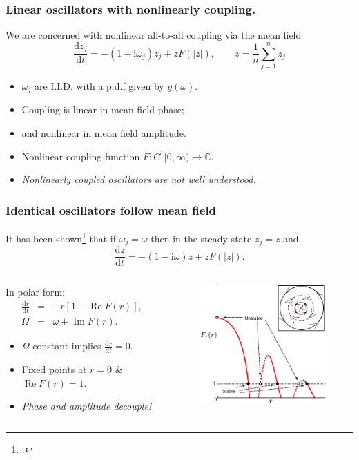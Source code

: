 \documentclass[10pt,reqno]{beamer}
\newcommand{\D}[2]{\frac{\mathrm{d} #1}{\mathrm{d} #2}}
\newcommand{\I}{\mathrm{i}}
\renewcommand{\mod}[1]{\left|#1\right|}
\renewcommand{\Re}{\operatorname{Re}}
\renewcommand{\Im}{\operatorname{Im}}
\newcommand{\complex}{\mathbb{C}}
\begin{document}
\begin{frame}[t]
\frametitle{Linear oscillators with nonlinearly coupling.}
We are concerned with nonlinear all-to-all coupling via the mean field
\[
\D{z_j}{t} = -(1-\I\omega_j)z_j + zF(\mod{z}), \qquad z= \frac{1}{n}\sum_{j=1}^n z_j
\] 
\begin{itemize}
\item $\omega_j$ are I.I.D. with a p.d.f given by $g(\omega)$.
\item Coupling is linear in mean field phase;
\item and nonlinear in mean field amplitude.
\item Nonlinear coupling function $F :C^1 [0,\infty) \rightarrow \complex$. 
\item {\em Nonlinearly coupled oscillators are not well understood.}
\end{itemize}
\end{frame}
\begin{frame}
\frametitle{Identical oscillators follow mean field}
It has been shown\footcite{Cathy2012} that if $\omega_j=\omega$ then 
in the steady state $z_j=z$ and 
\[
\D{z}{t}= -(1-\I\omega)z + zF(\mod{z}).
\] 
\begin{columns}
\begin{column}{0.59\textwidth}
In polar form:
\begin{eqnarray*}
\D{r}{t} &=& -r[1-\Re F(r)],\\
\Omega &=& \omega + \Im F(r).
\end{eqnarray*}
\begin{itemize}
\item $\Omega$ constant implies $\D{r}{t}=0$.
\item Fixed points at $r=0$ \& $\Re F(r)=1$.
\item {\em Phase and amplitude decouple!}
\end{itemize}
\end{column}
\begin{column}{0.39\textwidth}
\begin{figure}
\includegraphics{identical.pdf}
\end{figure}
\end{column}
\end{columns}
\end{frame}
\end{document}
